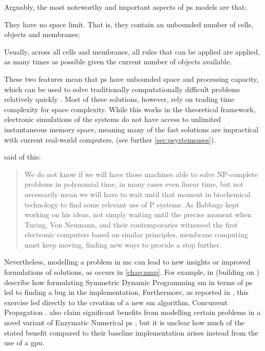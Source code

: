 Arguably, the most noteworthy and important aspects of \gls{ps} models are that:
\begin{inparaenum}[(i)]
\item They have no space limit.  That is, they contain an unbounded number of cells, objects and membranes;
\item Usually, across all cells and membranes, all rules that can be applied are applied, as many times as possible given the current number of objects available.
\end{inparaenum}
These two features mean that \gls{ps} have unbounded space and processing capacity, which can be used to solve traditionally computationally difficult problems relatively quickly \cite{Sosik2003,Jimenez2003,Paun1999a,Henderson2020}.  Most of these solutions, however, rely on trading time complexity for space complexity.  While this works in the theoretical framework, electronic simulations of the systems do not have access to unlimited instantaneous memory space, meaning many of the fast solutions are impractical with current real-world computers, \eg{} \cite{Cooper2019,Cooper2019a} \fxnote[inline]{[refs]} (see further \vref{sec:psystemsuses}).

\citeauthor{Valencia-Cabrera2019} said of this:
\blockcquote[][p.~213]{Valencia-Cabrera2019}{We do not know if we will have those machines able to solve NP-complete problems in polynomial time, in many cases even linear time, but  not necessarily mean we will have to wait until that moment in biochemical technology to find some relevant use of P systems. As Babbage kept working on his ideas, not simply waiting until the precise moment when Turing, Von Neumann, and their contemporaries witnessed the first electronic computers based on similar principles, membrane computing must keep moving, finding new ways to provide a step further.}

Nevertheless, modelling a problem in \gls{mc} can lead to new insights or improved formulations of solutions, as occurs in \cref{chap:nmp}.  For example, in \cite{GimelFarb2013a} (building on \cite{Gimelfarb2011}) \citeauthor{GimelFarb2013a} describe how formulating Symmetric Dynamic Programming \gls{sm} in terms of \gls{ps} led to finding a bug in the implementation,   Furthermore, as reported in \cite{Nicolescu2014b}, this exercise led directly to the creation of a new \gls{sm} algorithm, Concurrent Propagation \cite{Gimelfarb2012}.  \citeauthor{Pang2018} \cite{Pang2018} also claim significant benefits from modelling certain problems in a novel variant of Enzymatic Numerical \gls{ps} \cite{Pavel2010}, but it is unclear how much of the stated benefit compared to their baseline implementation arises instead from the use of a \gls{gpu}.

